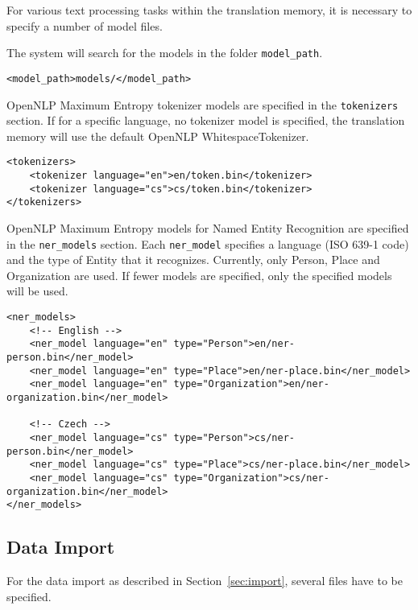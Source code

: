 For various text processing tasks within the translation memory, 
it is necessary to specify a number of model files.

The system will search for the models in the folder \verb#model_path#.
\begin{lstlisting}
<model_path>models/</model_path>
\end{lstlisting}

OpenNLP Maximum Entropy tokenizer models are specified in the \verb#tokenizers# section. If for a specific language, no tokenizer model is specified, the translation memory will use the default OpenNLP WhitespaceTokenizer.
\begin{lstlisting}
<tokenizers>
    <tokenizer language="en">en/token.bin</tokenizer>
    <tokenizer language="cs">cs/token.bin</tokenizer>
</tokenizers>
\end{lstlisting}

OpenNLP Maximum Entropy models for Named Entity Recognition are specified in the \verb#ner_models# section. Each \verb#ner_model# specifies a language (ISO 639-1 code) and the type of Entity that it recognizes. Currently, only Person, Place and Organization are used. If fewer models are specified, only the specified models will be used.

\begin{lstlisting}
<ner_models>
    <!-- English -->
    <ner_model language="en" type="Person">en/ner-person.bin</ner_model>
    <ner_model language="en" type="Place">en/ner-place.bin</ner_model>
    <ner_model language="en" type="Organization">en/ner-organization.bin</ner_model>

    <!-- Czech -->
    <ner_model language="cs" type="Person">cs/ner-person.bin</ner_model>
    <ner_model language="cs" type="Place">cs/ner-place.bin</ner_model>
    <ner_model language="cs" type="Organization">cs/ner-organization.bin</ner_model>
</ner_models>
\end{lstlisting}

\subsection{Data Import}

For the data import as described in Section~\ref{sec:import}, several files have to be specified.

